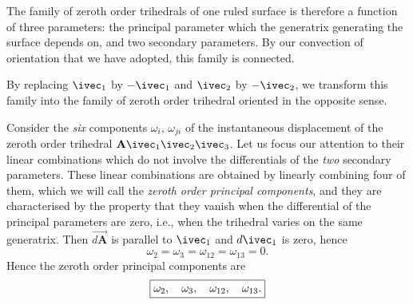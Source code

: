 The family of zeroth order trihedrals of one ruled surface is therefore a function of three parameters: the principal parameter which the generatrix generating the surface depends on, and two secondary parameters. By our convection of orientation that we have adopted, this family is connected.

By replacing $\ivec_{1}$ by $-\ivec_{1}$ and $\ivec_{2}$ by $-\ivec_{2}$, we transform this family into the family of zeroth order trihedral oriented in the opposite sense.

Consider the \emph{six} components $\omega_{i}$, $\omega_{ji}$ of the instantaneous displacement of the zeroth order trihedral $\mathbf{A}\ivec_{1}\ivec_{2}\ivec_{3}$. Let us focus our attention to their linear combinations which do not involve the differentials of the \emph{two} secondary parameters. These linear combinations are obtained by linearly combining four of them, which we will call the \emph{zeroth order principal components}, and they are characterised by the property that they vanish when the differential of the principal parameters are zero, i.e., when the trihedral varies on the same generatrix. Then $\overrightarrow{d\mathbf{A}}$ is parallel to $\ivec_{1}$ and $d\ivec_{1}$ is zero, hence
\[
\omega_{2}=\omega_{3}=\omega_{12}=\omega_{13}=0.
\]
Hence the zeroth order principal components are
\[
\boxed{
\omega_{2},\quad\omega_{3},\quad\omega_{12},\quad\omega_{13}.\vphantom{O}
}
\]

